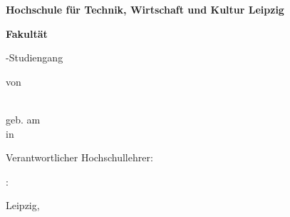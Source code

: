 \begin{titlepage}
{\centering
{\Large \textbf{Hochschule für Technik, Wirtschaft und Kultur Leipzig}\par}
{\large \textbf{Fakultät \fak} \par}
{\large \abschluss-Studiengang \studiengang\par}
\vspace{1.75cm}
{\Large \textbf{\titel}\par}
\vspace{1.5cm}
{\large \art \par}
\vspace{3cm}
{\large  von\par}
\vspace{1.25cm}
{\autor\\[3ex]
geb. am \gebdatum\\[3ex]
in \gebort\\[3ex]
\mnr\par}}
\vfill
{\noindent Verantwortlicher Hochschullehrer: \betreuerI 
\par \vspace{0.25cm}
\betreuerIItaetigkeit: \betreuerII
\par \vspace{0.75cm}
Leipzig, \zeitraum} %
\end{titlepage}